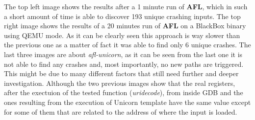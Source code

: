 \documentclass[../main.tex]{subfiles}
\begin{document}
The top left image shows the results after a 1 minute run of \textbf{AFL}, which
in such a short amount of time is able to discover 193 unique crashing inputs.
The top right image shows the results of a 20 minutes run of \textbf{AFL} on a
BlackBox binary using QEMU mode. As it can be clearly seen this approach is way
slower than the previous one as a matter of fact it was able to find only 6
unique crashes. The last three images are about \textit{afl-unicorn}, as it can
be seen from the last one it is not able to find any crashes and, most
importantly, no new paths are triggered. This might be due to many different
factors that still need further and deeper investigation. Although the two
previous images show that the real registers, after the exectuion of the tested
function (\textit{uridecode}), from inside GDB and the ones resulting from the
execution of Unicorn template have the same value except for some of them that
are related to the address of where the input is loaded.
\end{document}
